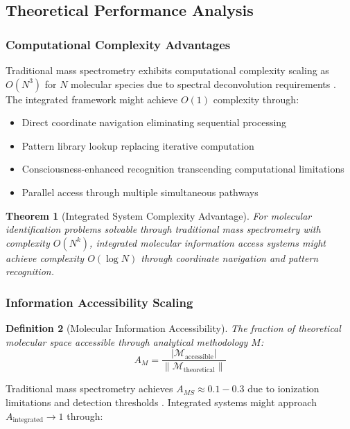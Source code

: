 \documentclass[11pt,a4paper]{article}
\newtheorem{theorem}{Theorem}[section]
\newtheorem{definition}[theorem]{Definition}
\theoremstyle{remark}
\begin{document}
\subsection{Theoretical Performance Analysis}

\subsubsection{Computational Complexity Advantages}

Traditional mass spectrometry exhibits computational complexity scaling as $O(N^3)$ for $N$ molecular species due to spectral deconvolution requirements \cite{ludwig2018data}. The integrated framework might achieve $O(1)$ complexity through:

\begin{itemize}
\item Direct coordinate navigation eliminating sequential processing
\item Pattern library lookup replacing iterative computation
\item Consciousness-enhanced recognition transcending computational limitations
\item Parallel access through multiple simultaneous pathways
\end{itemize}

\begin{theorem}[Integrated System Complexity Advantage]
For molecular identification problems solvable through traditional mass spectrometry with complexity $O(N^k)$, integrated molecular information access systems might achieve complexity $O(\log N)$ through coordinate navigation and pattern recognition.
\end{theorem}

\subsubsection{Information Accessibility Scaling}

\begin{definition}[Molecular Information Accessibility]
The fraction of theoretical molecular space accessible through analytical methodology $M$:
$$A_M = \frac{|\mathcal{M}_{\text{accessible}}|}{\|\mathcal{M}_{\text{theoretical}}\|}$$
\end{definition}

Traditional mass spectrometry achieves $A_{MS} \approx 0.1-0.3$ due to ionization limitations and detection thresholds \cite{bantscheff2007quantitative}. Integrated systems might approach $A_{\text{integrated}} \to 1$ through:
\end{document}
